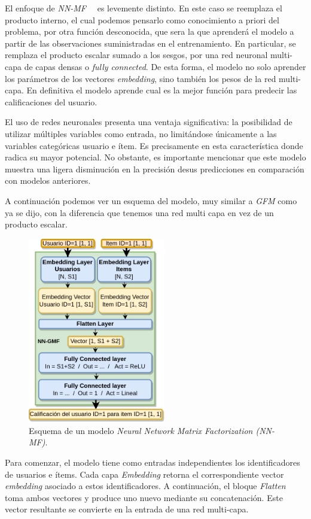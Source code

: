 \documentclass[11pt,a4paper,twoside]{thesis}
\begin{document}
El enfoque de {\textit{NN-MF}}~\cite{nnfm}~\cite{ncf} es levemente distinto. En
este caso se reemplaza el producto interno, el cual podemos pensarlo como
conocimiento a priori del problema, por otra función desconocida, que sera la
que aprenderá el modelo a partir de las observaciones suministradas en el
entrenamiento. En particular, se remplaza el producto escalar sumado a los
sesgos, por una red neuronal multi-capa de capas densas o \textit{fully
	connected}. De esta forma, el modelo no solo aprender los parámetros de los
vectores \textit{embedding}, sino también los pesos de la red multi-capa. En
definitiva el modelo aprende cual es la mejor función para predecir las
calificaciones del usuario.

El uso de redes neuronales presenta una ventaja significativa: la posibilidad
de utilizar múltiples variables como entrada, no limitándose únicamente a las
variables categóricas usuario e ítem. Es precisamente en esta característica
donde radica su mayor potencial. No obstante, es importante mencionar que este
modelo muestra una ligera disminución en la precisión desus predicciones en
comparación con modelos anteriores.

A continuación podemos ver un esquema del modelo, muy similar a \textit{GFM}
como ya se dijo, con la diferencia que tenemos una red multi capa en vez de un
producto escalar.

\begin{figure}[h!]
	\centering
	\includegraphics[width=6cm]{./images/NN-MF.png}

	\caption{
		Esquema de un modelo \textit{Neural Network Matrix Factorization (NN-MF)}.
	}
	\label{fig:NNMFModel}
\end{figure}

Para comenzar, el modelo tiene como entradas independientes los identificadores
de usuarios e ítems. Cada capa \textit{Embedding} retorna el correspondiente
vector \textit{embedding} asociado a estos identificadores. A continuación, el
bloque \textit{Flatten} toma ambos vectores y produce uno nuevo mediante su
concatenación. Este vector resultante se convierte en la entrada de una red
multi-capa.
\end{document}
